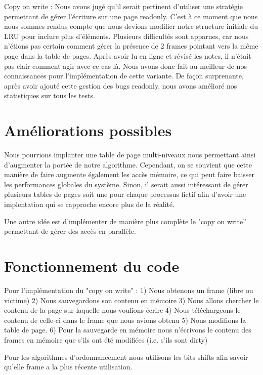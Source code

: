 \documentclass{article}
\begin{document}
\par
Copy on write : Nous avons jugé qu'il serait pertinent d'utiliser une stratégie permettant de gérer l’écriture sur une page readonly. C’est à ce moment que nous nous sommes rendus compte que nous devions modifier notre structure initiale du LRU pour inclure plus d’éléments. Plusieurs difficultés sont apparues, car nous n’étions pas certain comment gérer la présence de 2 frames pointant vers la même page dans la table de pages. Après avoir lu en ligne et révisé les notes, il n’était pas clair comment agir avec ce cas-là. Nous avons donc fait au meilleur de nos connaissances pour l’implémentation de cette variante. De façon surprenante, après avoir ajouté cette gestion des bugs readonly, nous avons amélioré nos statistiques sur tous les tests.



\section{Améliorations possibles}
Nous pourrions implanter une table de page multi-niveaux nous permettant ainsi d’augmenter la portée de notre algorithme. Cependant, on se souvient que cette manière de faire augmente également les accès mémoire, ce qui peut faire baisser les performances globales du système. Sinon, il serait aussi intéressant de gérer plusieurs tables de pages soit une pour chaque processus fictif afin d'avoir une implentation qui se rapproche encore plus de la réalité.

Une autre idée est d’implémenter de manière plus complète le "copy on write” permettant de gérer des accès en parallèle.

\section{Fonctionnement du code}

Pour l'implémentation du "copy on write" :
1) Nous obtenons un frame (libre ou victime)
2) Nous sauvegardons son contenu en mémoire
3) Nous allons chercher le contenu de la page sur laquelle nous voulions écrire 
4) Nous téléchargeons le contenu de celle-ci dans le frame que nous avions obtenu
5) Nous modifions la table de page. 
6) Pour la sauvegarde en mémoire nous n'écrivons le contenu des frames en mémoire que s'ils ont été modifiées (i.e. s’ils sont dirty)

\par 
Pour les algorithmes d'ordonnancement nous utilisons les bits shifts afin savoir qu'elle frame a la plus récente utilisation.
\end{document}
